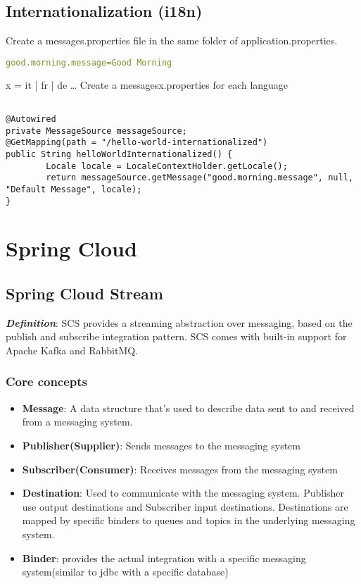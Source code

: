 \documentclass[a4paper, 12pt]{article}
\begin{document}
    \subsection{Internationalization (i18n)}
    Create a messages.properties file in the same folder of application.properties.
    \begin{lstlisting}[language=yaml]
good.morning.message=Good Morning
    \end{lstlisting}

    x = it | fr | de …
    Create a messages{x}.properties for each language

    \begin{lstlisting}

@Autowired
private MessageSource messageSource;
@GetMapping(path = "/hello-world-internationalized")
public String helloWorldInternationalized() {
        Locale locale = LocaleContextHolder.getLocale();
        return messageSource.getMessage("good.morning.message", null, "Default Message", locale);
}
    \end{lstlisting}


    \newpage


    \section{Spring Cloud}

    \subsection{Spring Cloud Stream}

    \textit{\textbf{Definition}}: SCS provides a streaming abstraction over messaging, based on the publish and subscribe integration pattern. SCS comes with built-in support for Apache Kafka and RabbitMQ.

    \subsubsection{Core concepts}

    \begin{itemize}
        \item \textbf{Message}: A data structure that's used to describe data sent to and received from a messaging system.
        \item \textbf{Publisher(Supplier)}: Sends messages to the messaging system
        \item \textbf{Subscriber(Consumer)}: Receives messages from the messaging system
        \item \textbf{Destination}: Used to communicate with the messaging system.
        Publisher use output destinations and Subscriber input destinations.
        Destinations are mapped by specific binders to queues and topics in the underlying messaging system.
        \item \textbf{Binder}: provides the actual integration with a specific messaging system(similar to jdbc with a specific database)
    \end{itemize}
\end{document}
